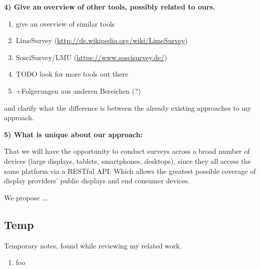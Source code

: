 	\textbf{4) Give an overview of other tools, possibly related to ours.}

		\begin{enumerate}
		\item give an overview of similar tools
		\item LimeSurvey (\url{http://de.wikipedia.org/wiki/LimeSurvey})
		\item SosciSurvey/LMU (\url{https://www.soscisurvey.de/})
		\item TODO look for more tools out there
		\item +Folgerungen aus anderen Bereichen (?)
		\end{enumerate}

		and clarify what the difference is between the already existing approaches to my approach.





	\textbf{5) What is unique about our approach:}

		That we will have the opportunity to conduct surveys across a broad number of devices (large displays, tablets, smartphones, desktops), since they all access the same platform via a RESTful API. Which allows the greatest possible coverage of display providers' public displays and end consumer devices.

		We propose ...





\subsection{Temp}

	Temporary notes, found while reviewing my related work.


	\begin{enumerate}
	\item foo
	\end{enumerate}
